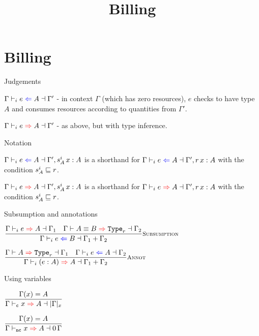 \documentclass{beamer}
\title{Billing}
\begin{document}
\section{Billing}

\begin{frame}{Judgements}

$\checktype{\Gamma}{e}{A}{\Gamma'}$ - in context $\Gamma$ (which has zero resources), $e$ checks to have type $A$ and consumes resources according to quantities from $\Gamma'$.

\vspace{2em}

$\infertype{\Gamma}{e}{A}{\Gamma'}$ - as above, but with type inference.

\end{frame}

\begin{frame}{Notation}

$\checktype{\Gamma}{e}{A}{\extend{\Gamma'}[\totalqty{s}{A}]{x}{A}}$ is a shorthand for $\checktype{\Gamma}{e}{A}{\extend{\Gamma'}[r]{x}{A}}$ with the condition $\subusage{\totalqty{s}{A}}{r}$.

\vspace{2em}

$\infertype{\Gamma}{e}{A}{\extend{\Gamma'}[\totalqty{s}{A}]{x}{A}}$ is a shorthand for $\infertype{\Gamma}{e}{A}{\extend{\Gamma'}[r]{x}{A}}$ with the condition $\subusage{\totalqty{s}{A}}{r}$.

\end{frame}

\begin{frame}{Subsumption and annotations}

\begin{center}
  $\infrule[Subsumption]{\infertype{\Gamma}{e}{A}{\Gamma_1} \quad \infertypeconv{\Gamma}{A}{B}[r]{\Gamma_2}}{\checktype{\Gamma}{e}{B}{\addctx{\Gamma_1}{\Gamma_2}}}$

  \vspace{2em}

  $\infrule[Annot]{\inferkind{\Gamma}{A}[r]{\Gamma_1} \quad \checktype{\Gamma}{e}{A}{\Gamma_2}}{\infertype{\Gamma}{\annot{e}{A}}{A}{\addctx{\Gamma_1}{\Gamma_2}}}$
\end{center}

\end{frame}

\begin{frame}{Using variables}

\begin{center}
  $\infrule{\findvar{\Gamma}{x}{A}}{\infertype{\Gamma}[\computable]{x}{A}{\varctx{\Gamma}{x}}}$

  \vspace{2em}

  $\infrule{\findvar{\Gamma}{x}{A}}{\infertype{\Gamma}[\noncomputable]{x}{A}{\scalectx{\Zero}{\Gamma}}}$
\end{center}

\end{frame}
\end{document}
